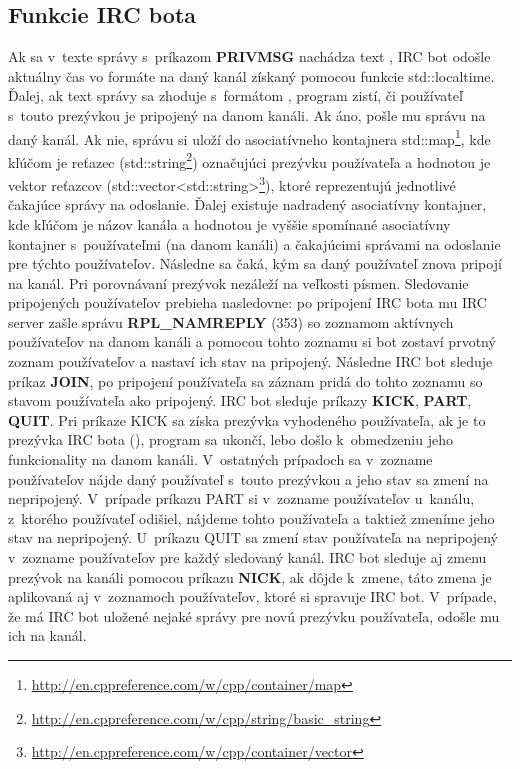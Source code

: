 \subsection{Funkcie IRC bota}
Ak sa v~texte správy s~príkazom \textbf{PRIVMSG} nachádza text , IRC bot odošle aktuálny čas vo formáte  na daný kanál získaný pomocou funkcie std::localtime. Ďalej, ak text správy sa zhoduje s~formátom , program zistí, či používateľ s~touto prezývkou je pripojený na danom kanáli. Ak áno, pošle mu správu na daný kanál. Ak nie, správu si uloží do asociatívneho kontajnera std::map\footnote{\url{http://en.cppreference.com/w/cpp/container/map}}, kde kľúčom je reťazec (std::string\footnote{\url{http://en.cppreference.com/w/cpp/string/basic_string}}) označujúci prezývku používateľa a hodnotou je vektor reťazcov (std::vector<std::string>\footnote{\url{http://en.cppreference.com/w/cpp/container/vector}}), ktoré reprezentujú jednotlivé čakajúce správy na odoslanie. Ďalej existuje nadradený asociatívny kontajner, kde kľúčom je názov kanála a hodnotou je vyššie spomínané asociatívny kontajner s~používateľmi (na danom kanáli) a čakajúcimi správami na odoslanie pre týchto používateľov. Následne sa čaká, kým sa daný používateľ znova pripojí na kanál. Pri porovnávaní prezývok nezáleží na veľkosti písmen. Sledovanie pripojených používateľov prebieha nasledovne: po pripojení IRC bota mu IRC server zašle správu \textbf{RPL\_NAMREPLY} (353) so zoznamom aktívnych používateľov na danom kanáli a pomocou tohto zoznamu si bot zostaví prvotný zoznam používateľov a nastaví ich stav na pripojený. Následne IRC bot sleduje príkaz \textbf{JOIN}, po pripojení používateľa sa záznam pridá do tohto zoznamu so stavom používateľa ako pripojený. IRC bot sleduje príkazy \textbf{KICK}, \textbf{PART}, \textbf{QUIT}. Pri príkaze KICK sa získa prezývka vyhodeného používateľa, ak je to prezývka IRC bota (), program sa ukončí, lebo došlo k~obmedzeniu jeho funkcionality na danom kanáli. V~ostatných prípadoch sa v~zozname používateľov nájde daný používateľ s~touto prezývkou a jeho stav sa zmení na nepripojený. V~prípade príkazu PART si v~zozname používateľov u~kanálu, z~ktorého používateľ odišiel, nájdeme tohto používateľa a taktiež zmeníme jeho stav na nepripojený. U~príkazu QUIT sa zmení stav používateľa na nepripojený v~zozname používateľov pre každý sledovaný kanál. IRC bot sleduje aj zmenu prezývok na kanáli pomocou príkazu \textbf{NICK}, ak dôjde k~zmene, táto zmena je aplikovaná aj v~zoznamoch používateľov, ktoré si spravuje IRC bot. V~prípade, že má IRC bot uložené nejaké správy pre novú prezývku používateľa, odošle mu ich na kanál.


